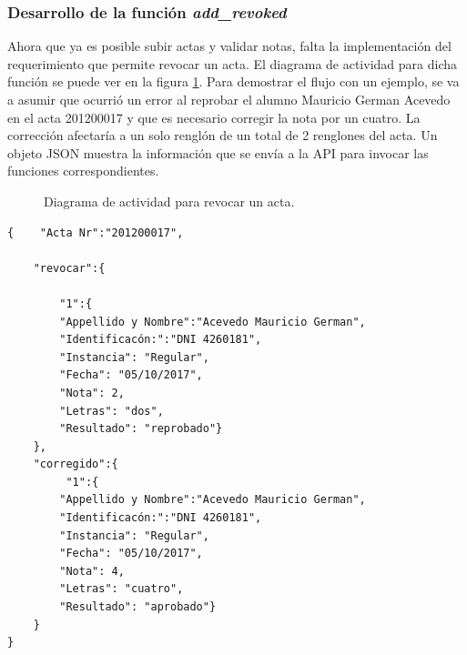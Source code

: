 \subsubsection{Desarrollo de la función \textit{add\_revoked}}
Ahora que ya es posible subir actas y validar notas, falta la implementación del requerimiento que permite revocar un acta. El diagrama de actividad para dicha función se puede ver en la figura \ref{fig:activity_revoke}. Para demostrar el flujo con un ejemplo, se va a asumir que ocurrió un error al reprobar el alumno Mauricio German Acevedo en el acta 201200017 y que es necesario corregir la nota por un cuatro. La corrección afectaría a un solo renglón de un total de 2 renglones del acta.
Un objeto JSON muestra la información que se envía a la API para invocar las funciones correspondientes.
\begin{figure}
    \caption{Diagrama de actividad para revocar un acta.}
    \label{fig:activity_revoke}
\end{figure}
\begin{verbatim}
{    "Acta Nr":"201200017",

    "revocar":{

        "1":{
        "Appellido y Nombre":"Acevedo Mauricio German",
        "Identificacón:":"DNI 4260181",
        "Instancia": "Regular",
        "Fecha": "05/10/2017",
        "Nota": 2,
        "Letras": "dos",
        "Resultado": "reprobado"}
    },
    "corregido":{
         "1":{
        "Appellido y Nombre":"Acevedo Mauricio German",
        "Identificacón:":"DNI 4260181",
        "Instancia": "Regular",
        "Fecha": "05/10/2017",
        "Nota": 4,
        "Letras": "cuatro",
        "Resultado": "aprobado"}
	}
}
\end{verbatim}
